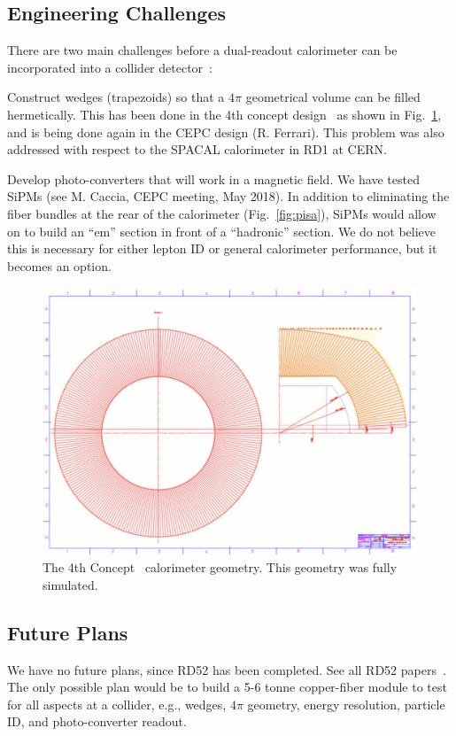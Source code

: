 \subsection{Engineering Challenges}

There are two main challenges before a dual-readout calorimeter can be incorporated into a collider detector~\cite{Hauptman_CEPC}:

\begin{description}

\item Construct wedges (trapezoids) so that a $4 \pi$ geometrical volume can be filled hermetically. This has been done in the 4th concept design~\cite{fourthConcept} as shown in Fig.~\ref{fig:hcalor}, and is being done again in the CEPC design (R. Ferrari).  This problem was also addressed with respect to the SPACAL calorimeter in RD1 at CERN.

\item Develop photo-converters that will work in a magnetic field.  We have tested SiPMs (see M. Caccia, CEPC meeting, May 2018).  In addition to eliminating the fiber bundles at the rear of the calorimeter (Fig.~\ref{fig:pisa}), SiPMs would allow on to build an ``em'' section in front of a ``hadronic'' section.  We do not believe this is necessary for either lepton ID or general calorimeter performance, but it becomes an option. 
 
\end{description}
 
\begin{figure}
  \centering
  \includegraphics[width=0.5\linewidth]{Calorimeter/DualReadout/hcalor}
  \caption{The 4th Concept~\cite{fourthConcept} calorimeter geometry. This geometry was fully simulated. }
  \label{fig:hcalor}
\end{figure}

\subsection{Future Plans}

We have no future plans, since RD52 has been completed. See all RD52 papers~\cite{dreamCollaboration}. The only possible plan would be to build a 5-6 tonne copper-fiber module to test for all aspects at a collider, e.g., wedges, $4 \pi$ geometry, energy resolution, particle ID, and photo-converter readout. 
